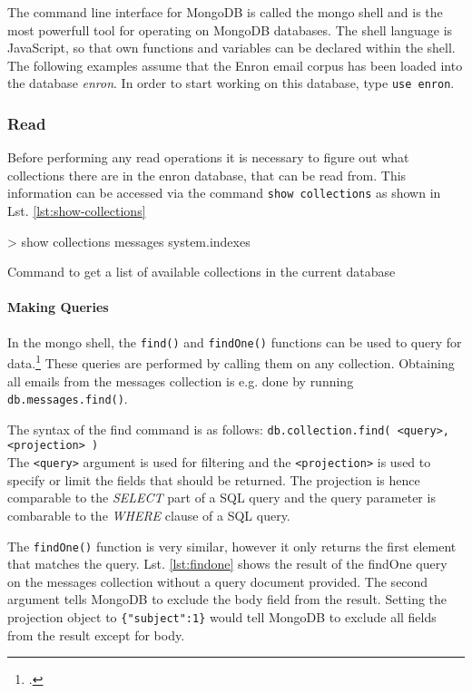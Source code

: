 The command line interface for MongoDB is called the mongo shell and is the most powerfull
tool for operating on MongoDB databases. The shell language is JavaScript, so that own
functions and variables can be declared within the shell.
The following examples assume that the Enron email corpus has been loaded into the database \textit{enron}.
In order to start working on this database, type \texttt{use enron}.

\subsubsection{Read}
Before performing any read operations it is necessary to figure out what collections
there are in the enron database, that can be read from. This information can be accessed
via the command \texttt{show collections} as shown in Lst. \ref{lst:show-collections}

\begin{listing}
    \begin{javascriptcode}
> show collections
messages
system.indexes
    \end{javascriptcode}
    \caption{Command to get a list of available collections in the current database}
    \label{lst:show-collections}
\end{listing}

\paragraph{Making Queries}
In the mongo shell, the \texttt{find()} and \texttt{findOne()} functions can be used to
query for data.\footcite[Cf.][7]{mongo_crud_manual}
These queries are performed by calling them on any collection.
Obtaining all emails from the messages collection is e.g. done by running
\texttt{db.messages.find()}.

The syntax of the find command is as follows: \texttt{db.collection.find(
<query>, <projection> )}\\
The \texttt{<query>} argument is used for filtering and the \texttt{<projection>} is used to specify
or limit the fields that should be returned.
The projection is hence comparable to the \textit{SELECT} part of a SQL query and the
query parameter is combarable to the \textit{WHERE} clause of a SQL query.


The \texttt{findOne()} function is very similar, however it only returns the first
element that matches the query. Lst. \ref{lst:findone} shows the result of the
findOne query on the messages collection without a query document provided. The
second argument tells MongoDB to exclude the body field from the result. Setting
the projection object to \texttt{\{"subject":1\}} would tell MongoDB to exclude
all fields from the result except for body.

